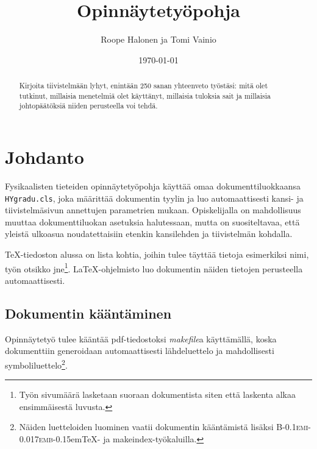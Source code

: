\documentclass[finnish,twoside,openright,utf]{HYgradu}
\title{Opinnäytetyöpohja}
\author{Roope Halonen ja Tomi Vainio}
\date{\today}
\begin{document}
\maketitle


\begin{abstract}
Kirjoita tiivistelmään lyhyt, enintään 250 sanan yhteenveto työstäsi: mitä olet tutkinut, millaisia menetelmiä olet käyttänyt, millaisia tuloksia sait ja millaisia johtopäätöksiä niiden perusteella voi tehdä.
\end{abstract}

\mytableofcontents

\mynomenclature

\chapter{Johdanto}

Fysikaalisten tieteiden opinnäytetyöpohja käyttää omaa dokumenttiluokkaansa \texttt{HYgradu.cls}, joka määrittää dokumentin tyylin ja luo automaattisesti kansi- ja tiivistelmäsivun annettujen parametrien mukaan. Opiskelijalla on mahdollisuus muuttaa dokumenttiluokan asetuksia halutessaan, mutta on suositeltavaa, että yleistä ulkoasua noudatettaisiin etenkin kansilehden ja tiivistelmän kohdalla.

\TeX-tiedoston alussa on lista kohtia, joihin tulee täyttää tietoja esimerkiksi nimi, työn otsikko jne\footnote{Työn sivumäärä lasketaan suoraan dokumentista siten että laskenta alkaa ensimmäisestä luvusta.}. \LaTeX-ohjelmisto luo dokumentin näiden tietojen perusteella automaattisesti.

\section{Dokumentin kääntäminen}
\label{sec:compile}

Opinnäytetyö tulee kääntää pdf-tiedostoksi \emph{makefile}a käyttämällä, koska dokumenttiin generoidaan automaattisesti lähdeluettelo ja mahdollisesti symboliluettelo\footnote{Näiden luetteloiden luominen vaatii dokumentin kääntämistä lisäksi \textsc{B\kern-0.1emi\kern-0.017emb}\kern-0.15em\TeX- ja makeindex-työkaluilla.}.
\end{document}
